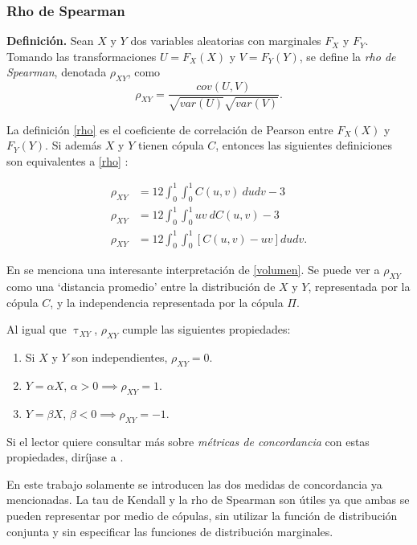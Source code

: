 \documentclass[11pt,a4paper]{article}
\begin{document}
\newpage

\subsubsection*{Rho de Spearman}

\textbf{Definición.} Sean $X$ y $Y$ dos variables aleatorias con marginales $F_X$ y $F_Y$. Tomando las transformaciones $U = F_X(X)$ y $V = F_Y(Y)$, se define la \textit{rho de Spearman}, denotada $\rho_{XY}$, como
\begin{equation} \label{rho}
\rho_{XY} = \frac{cov(U, V)}{\sqrt{var(U)}\sqrt{var(V)}}.
\end{equation}

La definición \eqref{rho} es el coeficiente de correlación de Pearson entre $F_X(X)$ y $F_Y(Y)$. Si además $X$ y $Y$ tienen cópula $C$, entonces las siguientes definiciones son equivalentes a \eqref{rho} \citep{nelsen}:

\begin{align}
\rho_{XY} &= 12\int_0^1 \int_0^1 C(u, v) \ dudv-3\\
\rho_{XY} &= 12\int_0^1 \int_0^1 uv \ dC(u,v)-3\\
\rho_{XY} &= 12\int_0^1\int_0^1 \left[ C(u, v) - uv \right] dudv \label{volumen}.
\end{align}

En \citet{nelsen} se menciona una interesante interpretación de \eqref{volumen}. Se puede ver a $\rho_{XY}$ como una `distancia promedio' entre la distribución de $X$ y $Y$, representada por la cópula $C$, y la independencia representada por la cópula $\Pi$.

Al igual que $\uptau_{XY}$, $\rho_{XY}$ cumple las siguientes propiedades:

\begin{enumerate}
\item Si $X$ y $Y$ son independientes, $\rho_{XY} = 0$.
\item $Y = \alpha X$, $\alpha > 0 \implies \rho_{XY} = 1$.
\item $Y = \beta X$, $\beta < 0 \implies \rho_{XY} = -1$.
\end{enumerate}

Si el lector quiere consultar más sobre \textit{métricas de concordancia} con estas propiedades, diríjase a \citet{nelsen}.

En este trabajo solamente se introducen las dos medidas de concordancia ya mencionadas. La tau de Kendall y la rho de Spearman son útiles ya que ambas se pueden representar por medio de cópulas, sin utilizar la función de distribución conjunta y sin especificar las funciones de distribución marginales.
\end{document}
